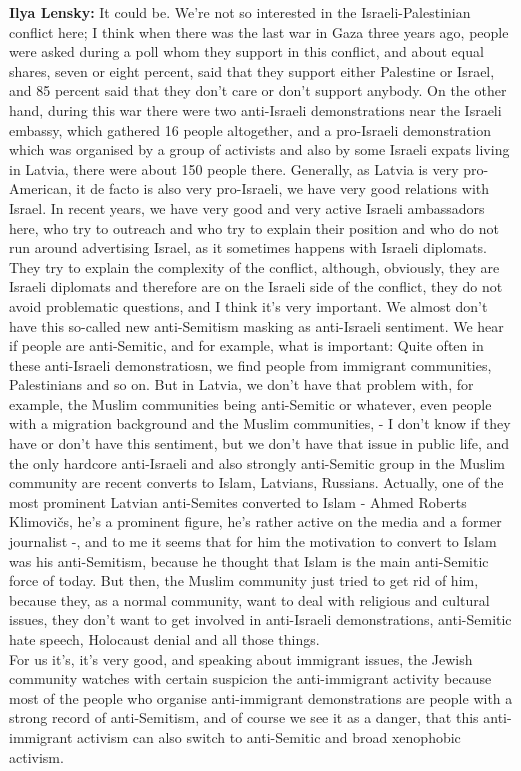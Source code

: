 \textbf{Ilya Lensky:} It could be. We’re not so interested in the Israeli-Palestinian conflict here; I think when there was the last war in Gaza three years ago, people were asked during a poll whom they support in this conflict, and about equal shares, seven or eight percent, said that they support either Palestine or Israel, and 85 percent said that they don’t care or don’t support anybody. On the other hand, during this war there were two anti-Israeli demonstrations near the Israeli embassy, which gathered 16 people altogether, 
and a pro-Israeli demonstration which was organised by a group of activists and also by some Israeli expats living in Latvia, there were about 150 people there. Generally, as Latvia is very pro-American, it de facto is also very pro-Israeli, we have very good relations with Israel. In recent years, we have very good and very active Israeli ambassadors here, who try to outreach and who try to explain their position and who do not run around advertising Israel, as it sometimes happens with Israeli diplomats. They try to explain the complexity of the conflict, although, obviously, they are Israeli diplomats and therefore are on the Israeli side of the conflict, they do not avoid problematic questions, and I think it's very important. We almost don’t have this so-called new anti-Semitism masking as anti-Israeli sentiment. We hear if people are anti-Semitic, and for example, what is important: Quite often in these anti-Israeli demonstratiosn, we find people from immigrant communities, Palestinians and so on. But in Latvia, we don’t have that problem with, for example, the Muslim communities being anti-Semitic or whatever, even people with a migration background and the Muslim communities, - I don’t know if they have or don’t have this sentiment, but we don’t have that issue in public life, and the only hardcore anti-Israeli and also strongly anti-Semitic group in the Muslim community are recent converts to Islam, Latvians, Russians. Actually, one of the most prominent Latvian anti-Semites converted to Islam - Ahmed Roberts Klimovičs, he’s a prominent figure, he’s rather active on the media and a former journalist -, and to me it seems that for him the motivation to convert to Islam was his anti-Semitism, because he thought that Islam is the main anti-Semitic force of today. But then, the Muslim community just tried to get rid of him, because they, as a normal community, want to deal with religious and cultural issues, they don’t want to get involved in anti-Israeli demonstrations, anti-Semitic hate speech, Holocaust denial and all those things. \\
For us it’s, it’s very good, and speaking about immigrant issues, the Jewish community watches with certain suspicion the anti-immigrant activity because most of the people who organise anti-immigrant demonstrations are people with a strong record of anti-Semitism, and of course we see it as a danger, that this anti-immigrant activism can also switch to anti-Semitic and broad xenophobic activism. 

